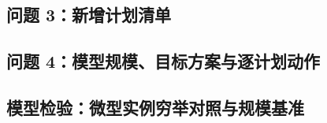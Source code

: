 \subsection{问题 3：新增计划清单}

\label{tab:q3plans}
{\footnotesize}
\addtocounter{table}{-1}%

\subsection{问题 4：模型规模、目标方案与逐计划动作}

\begin{table}[H]
\centering\small
\begin{minipage}[t]{0.52\linewidth}
\centering
\caption{问题 4 的模型规模与求解设置。}\label{tab:q4model}
\resizebox{\linewidth}{!}{}
\end{minipage}\hfill
\begin{minipage}[t]{0.44\linewidth}
\centering
\caption{问题 4 中被撤销计划的局部环境（列的含义同表~\ref{tab:q2cancel}）。}\label{tab:q4cancel}
\resizebox{\linewidth}{!}{}
\end{minipage}
\end{table}

\begin{table}[H]
\centering\small
\caption{四种目标方案在问题 4 上的对照（列的含义同表~\ref{tab:q2schemes}，另给出使用间隔调整动作的计划数）。}
\label{tab:q4schemes}
\resizebox{\linewidth}{!}{}
\end{table}

\label{tab:q4adj}
{\footnotesize}
\addtocounter{table}{-1}%

\subsection{模型检验：微型实例穷举对照与规模基准}


